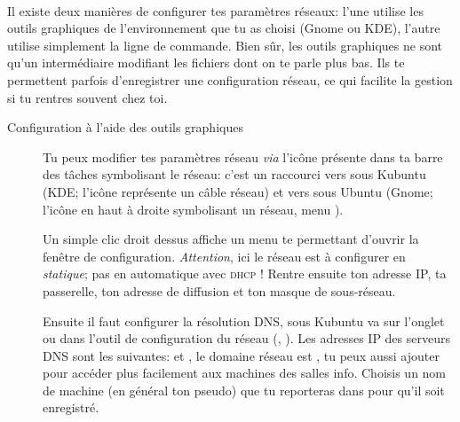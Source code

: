 \paragraph{}
\label{Ubuntu:IP}
Il existe deux manières de configurer tes paramètres réseaux: l'une utilise les outils graphiques de l'environnement que tu as choisi (Gnome ou KDE), l'autre utilise simplement la ligne de commande. Bien sûr, les outils graphiques ne sont qu'un intermédiaire modifiant les fichiers dont on te parle plus bas. Ils te permettent parfois d'enregistrer une configuration réseau, ce qui facilite la gestion si tu rentres souvent chez toi.

\begin{description}
\item[Configuration à l'aide des outils graphiques]
Tu peux modifier tes paramètres réseau \emph{via} l'icône présente dans ta barre des tâches symbolisant le réseau: c'est un raccourci vers  sous Kubuntu (KDE; l'icône représente un c\^able réseau) et vers  sous Ubuntu (Gnome; l'icône en haut à droite symbolisant un réseau, menu ).

Un simple clic droit dessus affiche un menu te permettant d'ouvrir la fenêtre de configuration. \emph{Attention}, ici le réseau est à configurer en \emph{statique}; pas en automatique avec \textsc{dhcp} ! Rentre ensuite ton adresse IP, ta passerelle, ton adresse de diffusion et ton masque de sous-réseau.

Ensuite il faut configurer la résolution DNS, sous Kubuntu va sur l'onglet  ou dans l'outil de configuration du réseau
(, ). Les adresses IP des serveurs DNS sont les suivantes:  et , le domaine réseau
est , tu peux aussi ajouter  pour accéder plus facilement aux machines des salles info. Choisis un nom de machine
(en général ton pseudo) que tu reporteras dans  pour qu'il soit enregistré.




\end{description}
